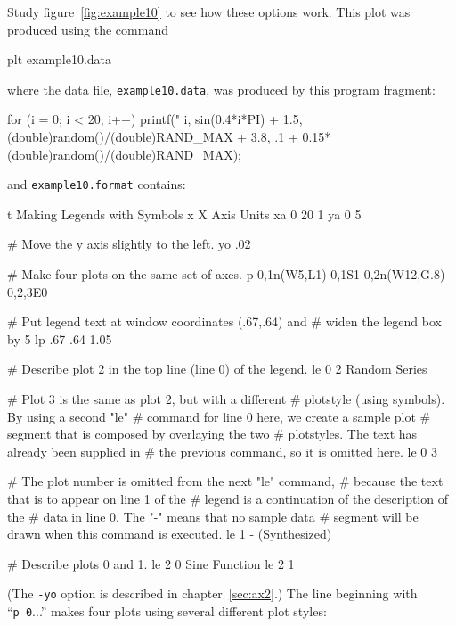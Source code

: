 \documentclass{book}
\begin{document}
Study figure~\ref{fig:example10} to see how these options work.
This plot was produced using the command
\begin{center}
\begin{boxedverbatim}
plt example10.data %
\end{boxedverbatim}
\end{center}
where the data file, {\tt example10.data}, was produced by this program
fragment:
\begin{center}
\begin{boxedverbatim}
for (i = 0; i < 20; i++)
    printf("%
           i,
           sin(0.4*i*PI) + 1.5,
           (double)random()/(double)RAND_MAX + 3.8,
           .1 + 0.15*(double)random()/(double)RAND_MAX);
\end{boxedverbatim}
\end{center}
and  {\tt example10.format} contains:
\begin{center}
\begin{boxedverbatim}
t Making Legends with Symbols
x X Axis Units
xa 0 20 1
ya 0 5

# Move the y axis slightly to the left.
yo .02

# Make four plots on the same set of axes.
p 0,1n(W5,L1) 0,1S1 0,2n(W12,G.8) 0,2,3E0

# Put legend text at window coordinates (.67,.64) and
# widen the legend box by 5%
lp .67 .64 1.05

# Describe plot 2 in the top line (line 0) of the legend.
le 0 2 Random Series

# Plot 3 is the same as plot 2, but with a different
# plotstyle (using symbols).  By using a second "le"
# command for line 0 here, we create a sample plot
# segment that is composed by overlaying the two
# plotstyles.  The text has already been supplied in
# the previous command, so it is omitted here.
le 0 3

# The plot number is omitted from the next "le" command,
# because the text that is to appear on line 1 of the
# legend is a continuation of the description of the
# data in line 0.  The "-" means that no sample data
# segment will be drawn when this command is executed.
le 1 - (Synthesized)

# Describe plots 0 and 1.
le 2 0 Sine Function
le 2 1
\end{boxedverbatim}
\end{center}

(The {\tt -yo} option is described in chapter~\ref{sec:ax2}.)
The line beginning with ``{\tt p~0}...'' makes four plots using
several different plot styles:
\end{document}
